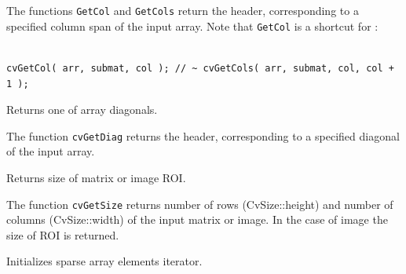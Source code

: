 The functions \texttt{GetCol} and \texttt{GetCols} return the header, corresponding to a specified column span of the input array. Note that \texttt{GetCol} is a shortcut for :

\begin{lstlisting}

cvGetCol( arr, submat, col ); // ~ cvGetCols( arr, submat, col, col + 1 );

\end{lstlisting}

\label{GetDiag}

Returns one of array diagonals.


\begin{description}
\end{description}

The function \texttt{cvGetDiag} returns the header, corresponding to a specified diagonal of the input array.

\label{GetSize}

Returns size of matrix or image ROI.


\begin{description}
\end{description}

The function \texttt{cvGetSize} returns number of rows (CvSize::height) and number of columns (CvSize::width) of the input matrix or image. In the case of image the size of ROI is returned.


\ifC
{}\label{InitSparseMatIterator}

Initializes sparse array elements iterator.


